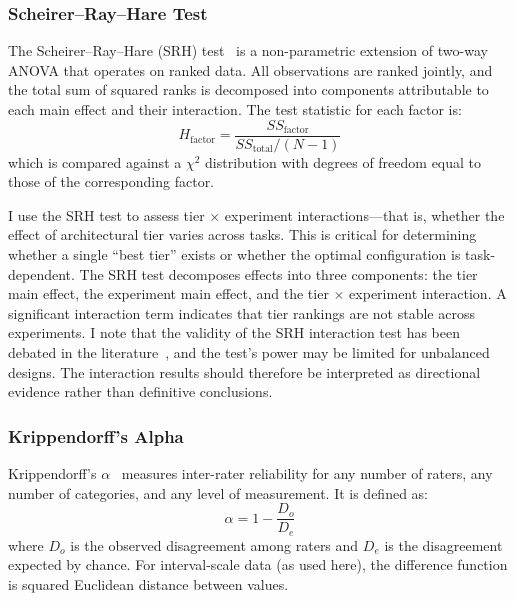 \documentclass[11pt]{article}
\begin{document}
\subsubsection{Scheirer--Ray--Hare Test}
\label{sec:srh_test}

The Scheirer--Ray--Hare (SRH) test~\cite{scheirer1976analysis} is a
non-parametric extension of two-way ANOVA that operates on ranked data. All
observations are ranked jointly, and the total sum of squared ranks is
decomposed into components attributable to each main effect and their
interaction. The test statistic for each factor is:
\begin{equation}
  H_{\text{factor}} = \frac{SS_{\text{factor}}}{SS_{\text{total}} / (N-1)}
\end{equation}
which is compared against a $\chi^2$ distribution with degrees of freedom
equal to those of the corresponding factor.

I use the SRH test to assess tier $\times$ experiment interactions---that is,
whether the effect of architectural tier varies across tasks. This is critical
for determining whether a single ``best tier'' exists or whether the optimal
configuration is task-dependent. The SRH test decomposes effects into three
components: the tier main effect, the experiment main effect, and the
tier $\times$ experiment interaction. A significant interaction term indicates
that tier rankings are not stable across experiments. I note that the
validity of the SRH interaction test has been debated in the
literature~\cite{scheirer1976analysis}, and the test's power may be limited
for unbalanced designs. The interaction results should therefore be
interpreted as directional evidence rather than definitive conclusions.

\subsubsection{Krippendorff's Alpha}
\label{sec:krippendorffs_alpha}

Krippendorff's $\alpha$~\cite{krippendorff2004content} measures inter-rater
reliability for any number of raters, any number of categories, and any level
of measurement. It is defined as:
\begin{equation}
  \alpha = 1 - \frac{D_o}{D_e}
\end{equation}
where $D_o$ is the observed disagreement among raters and $D_e$ is the
disagreement expected by chance. For interval-scale data (as used here), the
difference function is squared Euclidean distance between values.
\end{document}
